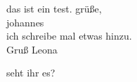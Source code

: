 \documentclass{article}
\begin{document}
das ist ein test. gr\"u{\ss}e,\\

johannes\\

ich schreibe mal etwas hinzu.\\

Gruß Leona

seht ihr es?
\end{document}
